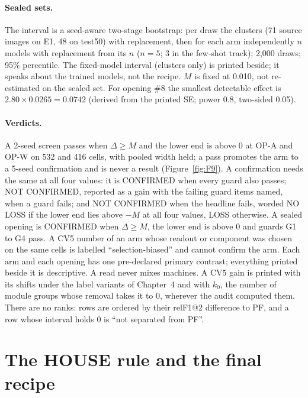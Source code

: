 \paragraph{Sealed sets.} The interval is a seed-aware two-stage bootstrap: per draw the clusters (71 source images on E1, 48 on test50)
with replacement, then for each arm independently $n$ models with replacement from its $n$ ($n=5$; 3 in the few-shot track); 2,000
draws; 95\% percentile. The fixed-model interval (clusters only) is printed beside; it speaks about the trained models, not the recipe.
$M$ is fixed at 0.010, not re-estimated on the sealed set. For opening \#8 the smallest detectable effect is $2.80\times0.0265=0.0742$
(derived from the printed SE; power 0.8, two-sided 0.05).

\paragraph{Verdicts.} A 2-seed screen passes when $\Delta\geq M$ and the lower end is above 0 at OP-A and OP-W on 532 and 416 cells,
with pooled width held; a pass promotes the arm to a 5-seed confirmation and is never a result (Figure~\ref{fig:F9}). A confirmation needs the same at all
four values: it is CONFIRMED when every guard also passes; NOT CONFIRMED, reported as a gain with the failing guard items named, when a
guard fails; and NOT CONFIRMED when the headline fails, worded NO LOSS if the lower end lies above $-M$ at all four values, LOSS
otherwise. A sealed opening is CONFIRMED when $\Delta\geq M$, the lower end is above 0 and guards G1 to G4 pass. A CV5 number of an arm
whose readout or component was chosen on the same cells is labelled ``selection-biased'' and cannot confirm the arm. Each arm and each
opening has one pre-declared primary contrast; everything printed beside it is descriptive. A read never mixes machines. A CV5 gain is
printed with its shifts under the label variants of Chapter~4 and with $k_0$, the number of module groups whose removal takes it to 0,
wherever the audit computed them. There are no ranks: rows are ordered by their relF1@2 difference to PF, and a row whose interval holds
0 is ``not separated from PF''.

\section{The HOUSE rule and the final recipe}
\label{sec:protocol-house}

